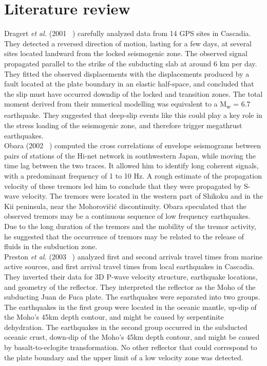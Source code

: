 \documentclass[main.tex]{subfiles}
\begin{document}
\part{Literature review}

Dragert \textit{et al.} (2001 ~\cite{DRA_2001}) carefully analyzed data from 14 GPS sites in Cascadia. They detected a reversed direction of motion, lasting for a few days, at several sites located landward from the locked seismogenic zone. The observed signal propagated parallel to the strike of the subducting slab at around 6 km per day. They fitted the observed displacements with the displacements produced by a fault located at the plate boundary in an elastic half-space, and concluded that the slip must have occurred downdip of the locked and transition zones. The total moment derived from their numerical modelling was equivalent to a M\textsubscript{w} = 6.7 earthquake. They suggested that deep-slip events like this could play a key role in the stress loading of the seismogenic zone, and therefore trigger megathrust earthquakes. \\

Obara (2002 ~\cite{OBA_2002}) computed the cross correlations of envelope seismograms between pairs of stations of the Hi-net network in southwestern Japan, while moving the time lag between the two traces. It allowed him to identify long coherent signals, with a predominant frequency of 1 to 10 Hz. A rough estimate of the propagation velocity of these tremors led him to conclude that they were propagated by S-wave velocity. The tremors were located in the western part of Shikoku and in the Kii peninsula, near the Mohorovi\u ci\'c discontinuity. Obara speculated that the observed tremors may be a continuous sequence of low frequency earthquakes. Due to the long duration of the tremors and the mobility of the tremor activity, he suggested that the occurrence of tremors may be related to the release of fluids in the subduction zone. \\

Preston \textit{et al.} (2003 ~\cite{PRE_2003}) analyzed first and second arrivals travel times from marine active sources, and first arrival travel times from local earthquakes in Cascadia. They inverted their data for 3D P-wave velocity structure, earthquake locations, and geometry of the reflector. They interpreted the reflector as the Moho of the subducting Juan de Fuca plate. The earthquakes were separated into two groups. The earthquakes in the first group were located in the oceanic mantle, up-dip of the Moho's 45km depth contour, and might be caused by serpentinite dehydration. The earthquakes in the second group occurred in the subducted oceanic crust, down-dip of the Moho's 45km depth contour, and might be caused by basalt-to-eclogite transformation. No other reflector that could correspond to the plate boundary and the upper limit of a low velocity zone was detected. \\
\end{document}
